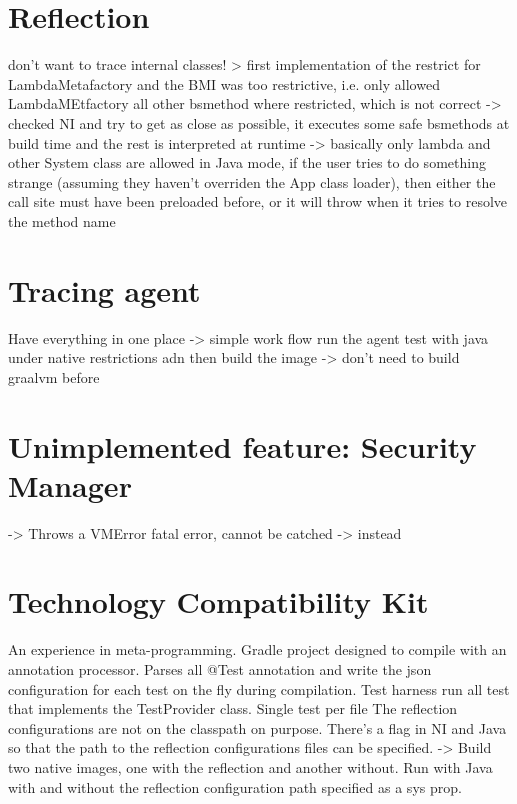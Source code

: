 \section{Reflection}
don't want to trace internal classes!
> first implementation of the restrict for LambdaMetafactory and the BMI was too restrictive,
i.e. only allowed LambdaMEtfactory all other bsmethod where restricted, which is not correct ->
checked NI and try to get as close as possible, it executes some safe bsmethods at build time and
the rest is interpreted at runtime -> basically only lambda and other System class are allowed in
Java mode, if the user tries to do something strange (assuming they haven’t overriden the App class
loader), then either the call site must have been preloaded before, or it will throw when it tries to
resolve the method name

\section{Tracing agent}

Have everything in one place -> simple work flow run the agent test with java under native restrictions adn then build the image -> don't need to build graalvm before

\section{Unimplemented feature: Security Manager}
-> Throws a VMError fatal error, cannot be catched
-> instead

\section{Technology Compatibility Kit}
An experience in meta-programming. 
Gradle project designed to compile with an annotation processor. Parses all @Test annotation and write the json configuration for each test on the fly
during compilation.
Test harness run all test that implements the TestProvider class. Single test per file
The reflection configurations are not on the classpath on purpose. There's a flag in NI and Java so that the path to the reflection configurations files can be specified.
-> Build two native images, one with the reflection and another without. Run with Java with and without the reflection configuration path specified as a sys prop.

